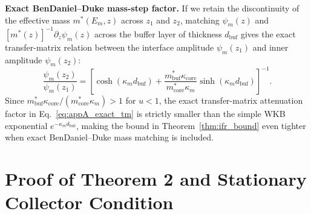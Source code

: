 \documentclass[11pt,letterpaper]{article}
\begin{document}
\textbf{Exact BenDaniel--Duke mass-step factor.} If we retain the discontinuity of the effective mass $m^*(E_m, z)$ across $z_1$ and $z_2$, matching $\psi_m(z)$ and $[m^*(z)]^{-1}\partial_z \psi_m(z)$ across the buffer layer of thickness $d_{\mathrm{buf}}$ gives the exact transfer-matrix relation between the interface amplitude $\psi_m(z_1)$ and inner amplitude $\psi_m(z_2)$:
\begin{equation}
\frac{\psi_m(z_2)}{\psi_m(z_1)} = \left[ \cosh(\kappa_m d_{\mathrm{buf}}) + \frac{m_{\mathrm{buf}}^* \kappa_{\mathrm{core}}}{m_{\mathrm{core}}^* \kappa_m}\sinh(\kappa_m d_{\mathrm{buf}}) \right]^{-1}.
\label{eq:appA_exact_tm}
\end{equation}
Since $m_{\mathrm{buf}}^* \kappa_{\mathrm{core}} / (m_{\mathrm{core}}^* \kappa_m) > 1$ for $u < 1$, the exact transfer-matrix attenuation factor in Eq.~\eqref{eq:appA_exact_tm} is strictly smaller than the simple WKB exponential $e^{-\kappa_m d_{\mathrm{buf}}}$, making the bound in Theorem~\ref{thm:ifr_bound} even tighter when exact BenDaniel--Duke mass matching is included.

\section{Proof of Theorem 2 and Stationary Collector Condition}
\label{app:proof_thm2}
\end{document}
